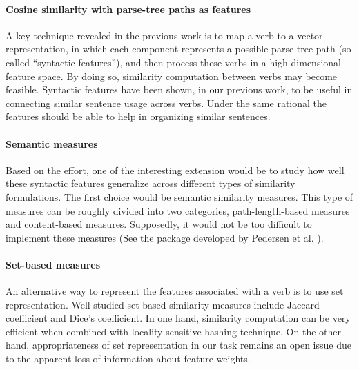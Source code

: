 \documentclass{article}[12pt]
\begin{document}
\paragraph{Cosine similarity with parse-tree paths as features} A key technique
revealed in the previous work \cite{gordon:gsr} is to map a verb to a vector
representation, in which each component represents a possible parse-tree path
(so called ``syntactic features''), and then process these verbs in a high
dimensional feature space.  By doing so, similarity computation between verbs
may become feasible.  Syntactic features have been shown, in our previous work,
to be useful in connecting similar sentence usage across verbs.  Under the same
rational the features should be able to help in organizing similar sentences.  

\paragraph{Semantic measures} Based on the effort, one of the interesting
extension would be to study how well these syntactic features generalize across
different types of similarity formulations.  The first choice would be semantic
similarity measures.  This type of measures can be roughly divided into two
categories, path-length-based measures and content-based measures.  Supposedly,
it would not be too difficult to implement these measures (See the package
developed by Pedersen et al. \cite{pedersen2004wsm}). 

\paragraph{Set-based measures} An alternative way to represent the features
associated with a verb is to use set representation.  Well-studied set-based
similarity measures include Jaccard coefficient and Dice's coefficient.  In one
hand, similarity computation can be very efficient when combined with
locality-sensitive hashing \cite{indyk1998ann,broder2000mwi} technique.  On the
other hand, appropriateness of set representation in our task remains an open
issue due to the apparent loss of information about feature weights.

% 
\end{document}
